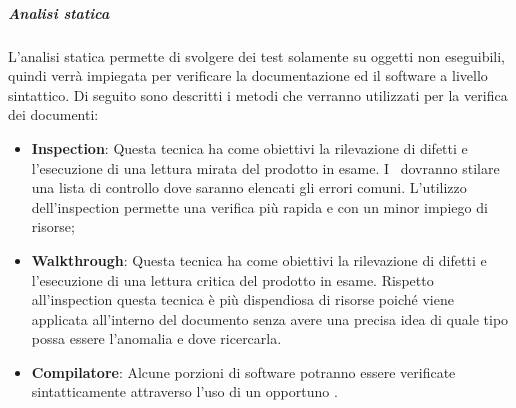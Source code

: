 \documentclass[../PianoDiQualifica.tex]{subfiles}
\begin{document}
				\subparagraph{Analisi statica}
				L'analisi statica permette di svolgere dei test solamente su oggetti non eseguibili, quindi verrà impiegata per verificare la documentazione ed il software a livello sintattico. Di seguito sono descritti i metodi che verranno utilizzati per la verifica dei documenti:
				\begin{itemize}
					\item \textbf{Inspection}: Questa tecnica ha come obiettivi la rilevazione di difetti e l'esecuzione di una lettura mirata del prodotto in esame. I \verificatori\ dovranno stilare una lista di controllo dove saranno elencati gli errori comuni. L'utilizzo dell'inspection permette una verifica più rapida e con un minor impiego di risorse;
					\item \textbf{Walkthrough}: Questa tecnica ha come obiettivi la rilevazione di difetti e l'esecuzione di una lettura critica del prodotto in esame. Rispetto all'inspection questa tecnica è più dispendiosa di risorse poiché viene applicata all'interno del documento senza avere una precisa idea di quale tipo possa essere l'anomalia e dove ricercarla.
					\item \textbf{Compilatore}: Alcune porzioni di software potranno essere verificate sintatticamente attraverso l'uso di un opportuno .
				\end{itemize}
\end{document}
